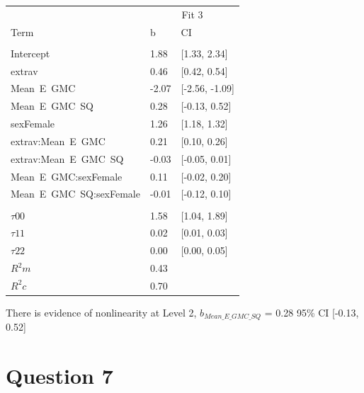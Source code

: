 \documentclass[]{article}
\begin{document}
\begin{tabular}{lll}
\toprule
\multicolumn{1}{c}{ } & \multicolumn{2}{c}{Fit 3} \\
\cmidrule(l{2pt}r{2pt}){2-3}
Term & b & CI\\
\midrule
\addlinespace[0.3em]
\multicolumn{3}{l}{\textbf{Fixed}}\\
\hspace{1em}Intercept & 1.88 & [1.33, 2.34]\\
\hspace{1em}extrav & 0.46 & [0.42, 0.54]\\
\hspace{1em}Mean\ E\ GMC & -2.07 & [-2.56, -1.09]\\
\hspace{1em}Mean\ E\ GMC\ SQ & 0.28 & [-0.13, 0.52]\\
\hspace{1em}sexFemale & 1.26 & [1.18, 1.32]\\
\hspace{1em}extrav:Mean\ E\ GMC & 0.21 & [0.10, 0.26]\\
\hspace{1em}extrav:Mean\ E\ GMC\ SQ & -0.03 & [-0.05, 0.01]\\
\hspace{1em}Mean\ E\ GMC:sexFemale & 0.11 & [-0.02, 0.20]\\
\hspace{1em}Mean\ E\ GMC\ SQ:sexFemale & -0.01 & [-0.12, 0.10]\\
\addlinespace[0.3em]
\multicolumn{3}{l}{\textbf{Random}}\\
\hspace{1em}$\tau {00}$ & 1.58 & [1.04, 1.89]\\
\hspace{1em}$\tau {11}$ & 0.02 & [0.01, 0.03]\\
\hspace{1em}$\tau {22}$ & 0.00 & [0.00, 0.05]\\
$R^2 m$ & 0.43 & \\
$R^2 c$ & 0.70 & \\
\bottomrule
\end{tabular}

There is evidence of nonlinearity at Level 2, \(b_{Mean\_E\_GMC\_SQ}\) =
0.28 95\% CI {[}-0.13, 0.52{]}

\section{Question 7}\label{question-7}
\end{document}
